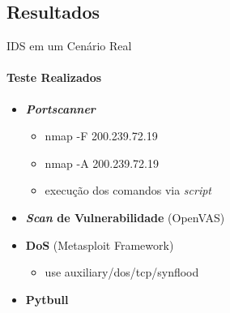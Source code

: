 \documentclass[aspectratio=169]{beamer}
\begin{document}
\subsection{Resultados}
\begin{frame}{IDS em um Cenário Real}
    \framesubtitle{Teste Realizados}
    \begin{itemize}
        \item \textbf{\textit{Portscanner}}
        \begin{itemize}
            \item nmap -F 200.239.72.19
            \item nmap -A 200.239.72.19
            \item execução dos comandos via \textit{script}
        \end{itemize}
        \item \textbf{\textit{Scan} de Vulnerabilidade} (OpenVAS)
        \item \textbf{DoS} (Metasploit Framework)
            \begin{itemize}
                \item use auxiliary/dos/tcp/synflood
            \end{itemize}        
        \item \textbf{Pytbull}
    \end{itemize}
\end{frame}
\end{document}
